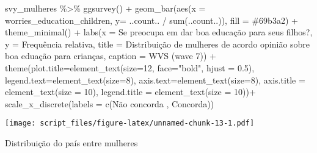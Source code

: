 \documentclass[
]{article}
\newenvironment{Shaded}{\begin{snugshade}}{\end{snugshade}}
\newcommand{\AttributeTok}[1]{\textcolor[rgb]{0.77,0.63,0.00}{#1}}
\newcommand{\DecValTok}[1]{\textcolor[rgb]{0.00,0.00,0.81}{#1}}
\newcommand{\FloatTok}[1]{\textcolor[rgb]{0.00,0.00,0.81}{#1}}
\newcommand{\FunctionTok}[1]{\textcolor[rgb]{0.00,0.00,0.00}{#1}}
\newcommand{\NormalTok}[1]{#1}
\newcommand{\SpecialCharTok}[1]{\textcolor[rgb]{0.00,0.00,0.00}{#1}}
\newcommand{\StringTok}[1]{\textcolor[rgb]{0.31,0.60,0.02}{#1}}
\begin{document}
\begin{Shaded}
\begin{Highlighting}[]
\NormalTok{svy\_mulheres }\SpecialCharTok{\%\textgreater{}\%}
  \FunctionTok{ggsurvey}\NormalTok{() }\SpecialCharTok{+}
  \FunctionTok{geom\_bar}\NormalTok{(}\FunctionTok{aes}\NormalTok{(}\AttributeTok{x =}\NormalTok{ worries\_education\_children, }\AttributeTok{y=}\NormalTok{ ..count.. }\SpecialCharTok{/} \FunctionTok{sum}\NormalTok{(..count..)), }\AttributeTok{fill =} \StringTok{\textquotesingle{}\#69b3a2\textquotesingle{}}\NormalTok{) }\SpecialCharTok{+}
  \FunctionTok{theme\_minimal}\NormalTok{() }\SpecialCharTok{+}
  \FunctionTok{labs}\NormalTok{(}\AttributeTok{x =} \StringTok{\textquotesingle{}Se preocupa em dar boa educação para seus filhos?\textquotesingle{}}\NormalTok{,}
       \AttributeTok{y =} \StringTok{\textquotesingle{}Frequência relativa\textquotesingle{}}\NormalTok{,}
       \AttributeTok{title =} \StringTok{\textquotesingle{}Distribuição de mulheres de acordo opinião sobre boa eduação para crianças\textquotesingle{}}\NormalTok{,}
       \AttributeTok{caption =} \StringTok{\textquotesingle{}WVS (wave 7)\textquotesingle{}}\NormalTok{) }\SpecialCharTok{+}
  \FunctionTok{theme}\NormalTok{(}\AttributeTok{plot.title=}\FunctionTok{element\_text}\NormalTok{(}\AttributeTok{size=}\DecValTok{12}\NormalTok{, }\AttributeTok{face=}\StringTok{"bold"}\NormalTok{, }\AttributeTok{hjust =} \FloatTok{0.5}\NormalTok{),}
        \AttributeTok{legend.text=}\FunctionTok{element\_text}\NormalTok{(}\AttributeTok{size=}\DecValTok{8}\NormalTok{),}
        \AttributeTok{axis.text=}\FunctionTok{element\_text}\NormalTok{(}\AttributeTok{size=}\DecValTok{8}\NormalTok{),}
        \AttributeTok{axis.title =} \FunctionTok{element\_text}\NormalTok{(}\AttributeTok{size =} \DecValTok{10}\NormalTok{),}
        \AttributeTok{legend.title =} \FunctionTok{element\_text}\NormalTok{(}\AttributeTok{size =} \DecValTok{10}\NormalTok{))}\SpecialCharTok{+}
  \FunctionTok{scale\_x\_discrete}\NormalTok{(}\AttributeTok{labels =} \FunctionTok{c}\NormalTok{(}\StringTok{\textquotesingle{}Não concorda \textquotesingle{}}\NormalTok{, }\StringTok{\textquotesingle{}Concorda\textquotesingle{}}\NormalTok{))}
\end{Highlighting}
\end{Shaded}

\texttt{[image: script\_files/figure-latex/unnamed-chunk-13-1.pdf]}

Distribuição do país entre mulheres
\end{document}
